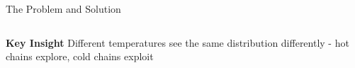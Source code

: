 \documentclass[aspectratio=169]{beamer}
\begin{document}
\begin{frame}{The Problem and Solution}
\begin{columns}
	\end{columns}

			\vspace{0.2cm}
	\textbf{Key Insight}
		Different temperatures see the same distribution differently - hot chains explore, cold chains exploit

\end{frame}





\end{document}
